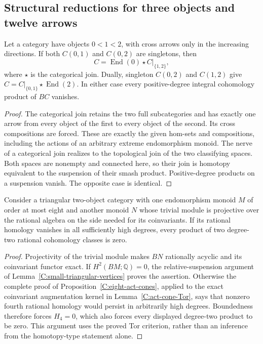 \subsection{Structural reductions for three objects and twelve arrows}

\begin{lemma}
\label{C:singleton-cross-join}
Let a category have objects $0<1<2$, with cross arrows only
in the increasing directions. If both $C(0,1)$ and $C(0,2)$
are singletons, then
\[
 C=\operatorname{End}(0)\star C|_{\{1,2\}},
\]
where $\star$ is the categorical join. Dually, singleton
$C(0,2)$ and $C(1,2)$ give
$C=C|_{\{0,1\}}\star\operatorname{End}(2)$.
In either case every positive-degree integral cohomology
product of $BC$ vanishes.
\end{lemma}
\begin{proof}
The categorical join retains the two full subcategories and
has exactly one arrow from every object of the first to every
object of the second. Its cross compositions are forced.
These are exactly the given hom-sets and compositions, including
the actions of an arbitrary extreme endomorphism monoid.
The nerve of a categorical join realizes to the topological
join of the two classifying spaces. Both spaces are nonempty
and connected here, so their join is homotopy equivalent to
the suspension of their smash product. Positive-degree products
on a suspension vanish. The opposite case is identical.
\end{proof}

\begin{lemma}
\label{C:eight-bounded-cups}
Consider a triangular two-object category with one endomorphism
monoid $M$ of order at most eight and another monoid $N$ whose
trivial module is projective over the rational algebra on the
side needed for its coinvariants. If its rational homology
vanishes in all sufficiently high degrees, every product of
two degree-two rational cohomology classes is zero.
\end{lemma}
\begin{proof}
Projectivity of the trivial module makes $BN$ rationally
acyclic and its coinvariant functor exact. If
$H^2(BM;\mathbb Q)=0$, the relative-suspension argument of
Lemma~\ref{C:small-triangular-vertices} proves the assertion.
Otherwise the complete proof of
Proposition~\ref{C:eight-act-cones}, applied to the exact
coinvariant augmentation kernel in
Lemma~\ref{C:act-cone-Tor}, says that nonzero fourth rational
homology would persist in arbitrarily high degrees. Boundedness
therefore forces $H_4=0$, which also forces every displayed
degree-two product to be zero. This argument uses the proved
Tor criterion, rather than an inference from the homotopy-type
statement alone.
\end{proof}

